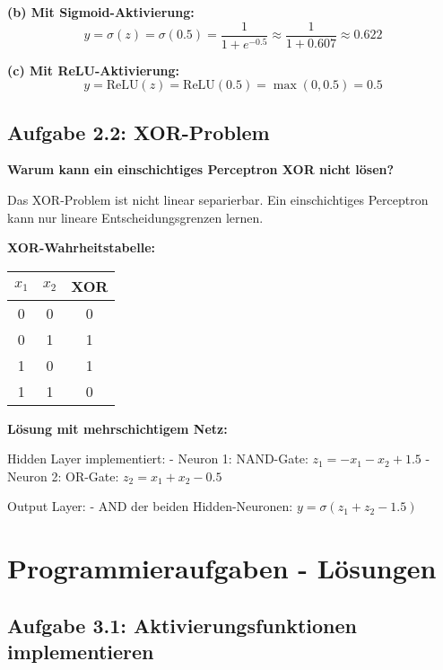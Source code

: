 \documentclass[12pt,a4paper]{article}
\begin{document}
\textbf{(b) Mit Sigmoid-Aktivierung:}
\begin{equation}
y = \sigma(z) = \sigma(0.5) = \frac{1}{1 + e^{-0.5}} \approx \frac{1}{1 + 0.607} \approx 0.622
\end{equation}

\textbf{(c) Mit ReLU-Aktivierung:}
\begin{equation}
y = \text{ReLU}(z) = \text{ReLU}(0.5) = \max(0, 0.5) = 0.5
\end{equation}

\subsection{Aufgabe 2.2: XOR-Problem}

\textbf{Warum kann ein einschichtiges Perceptron XOR nicht lösen?}

Das XOR-Problem ist nicht linear separierbar. Ein einschichtiges Perceptron kann nur lineare Entscheidungsgrenzen lernen.

\textbf{XOR-Wahrheitstabelle:}
\begin{center}
\begin{tabular}{|c|c|c|}
\hline
$x_1$ & $x_2$ & XOR \\
\hline
0 & 0 & 0 \\
0 & 1 & 1 \\
1 & 0 & 1 \\
1 & 1 & 0 \\
\hline
\end{tabular}
\end{center}

\textbf{Lösung mit mehrschichtigem Netz:}

Hidden Layer implementiert:
- Neuron 1: NAND-Gate: $z_1 = -x_1 - x_2 + 1.5$
- Neuron 2: OR-Gate: $z_2 = x_1 + x_2 - 0.5$

Output Layer:
- AND der beiden Hidden-Neuronen: $y = \sigma(z_1 + z_2 - 1.5)$

\section{Programmieraufgaben - Lösungen}

\subsection{Aufgabe 3.1: Aktivierungsfunktionen implementieren}
\end{document}
